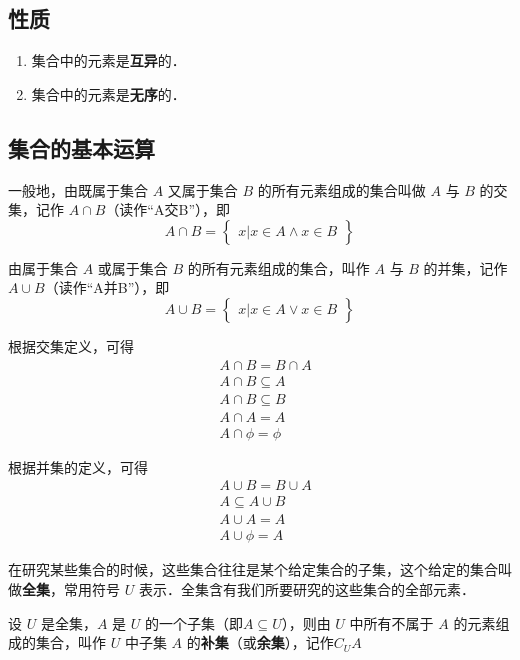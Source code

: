 \subsection{性质}
\begin{enumerate}
\item 集合中的元素是\textbf{互异}的．
\item 集合中的元素是\textbf{无序}的．
\end{enumerate}

\subsection{集合的基本运算}
一般地，由既属于集合 $A$ 又属于集合 $B$ 的所有元素组成的集合叫做 $A$ 与 $B$ 的交集，记作 $A \cap B$（读作“A交B”），即
\begin{equation}
A\cap B = \begin{Bmatrix} x|x\in A \wedge x\in B \end{Bmatrix}
\end{equation}

由属于集合 $A$ 或属于集合 $B$ 的所有元素组成的集合，叫作 $A$ 与 $B$ 的并集，记作 $A\cup B$（读作“A并B”），即
\begin{equation}
A\cup B = \begin{Bmatrix}x|x\in A \vee x\in B\end{Bmatrix}
\end{equation}

根据交集定义，可得
\begin{equation}
\begin{aligned}
&A\cap B = B\cap A \\ 
&A\cap B \subseteq A \\
&A\cap B \subseteq B \\
&A\cap A = A \\
&A\cap \phi = \phi
\end{aligned}
\end{equation}

根据并集的定义，可得
\begin{equation}
\begin{aligned}
&A\cup B = B\cup A \\
&A\subseteq A\cup B \\
&A\cup A = A \\
&A\cup \phi = A
\end{aligned}
\end{equation}

在研究某些集合的时候，这些集合往往是某个给定集合的子集，这个给定的集合叫做\textbf{全集}，常用符号 $U$ 表示．全集含有我们所要研究的这些集合的全部元素．

设 $U$ 是全集，$A$ 是 $U$ 的一个子集（即$A\subseteq U$），则由 $U$ 中所有不属于 $A$ 的元素组成的集合，叫作 $U$ 中子集 $A$ 的\textbf{补集}（或\textbf{余集}），记作$C_UA$